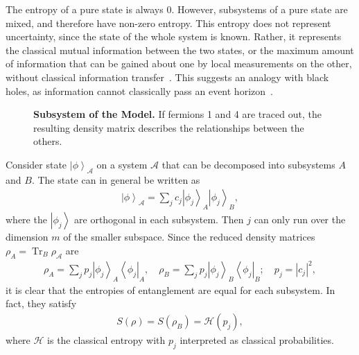 \documentclass[12pt]{article} %
\renewcommand{\cal}{\mathcal}
\newcommand{\ket}[1]{\left|#1\right\rangle}
\newcommand{\bra}[1]{\left\langle#1\right|}
\DeclareMathOperator{\Tr}{Tr}
\begin{document}
The entropy of a pure state is always 0. However, subsystems of a pure state are mixed, and therefore have non-zero entropy. This entropy does not represent uncertainty, since the state of the whole system is known. Rather, it represents the classical mutual information between the two states, or the maximum amount of information that can be gained about one by local measurements on the other, without classical information transfer~\cite{janzing09}. This suggests an analogy with black holes, as information cannot classically pass an event horizon~\cite{ryu06}.

\begin{figure}
	\centering
	\caption{\textbf{Subsystem of the Model.} If fermions 1 and 4 are traced out, the resulting density matrix describes the relationships between the others.}
	\label{fig:subsys}
\end{figure}

Consider state $\ket{\phi}_\cal{A}$ on a system $\cal A$ that can be decomposed into subsystems $A$ and $B$. The state can in general be written as 
\begin{align}
\ket{\phi}_\cal{A} = \sum_jc_j\ket{\phi_j}_A\ket{\phi_j}_B,
\end{align}
where the $\ket{\phi_j}$ are orthogonal in each subsystem. Then $j$ can only run over the dimension $m$ of the smaller subspace. Since the reduced density matrices $\rho_A = \Tr_B\rho_{\cal A}$ are
\begin{align}
\rho_A = \sum_jp_j\ket{\phi_j}_A\bra{\phi_j}_A, \quad \rho_B = \sum_jp_j\ket{\phi_j}_B\bra{\phi_j}_B; \quad p_j = |c_j|^2,
\end{align}
it is clear that the entropies of entanglement are equal for each subsystem. In fact, they satisfy 
\begin{align}
S(\rho) = S(\rho_B) = \cal{H}(p_j),
\end{align}
where $\cal H$ is the classical entropy with $p_j$ interpreted as classical probabilities. 
\end{document}
